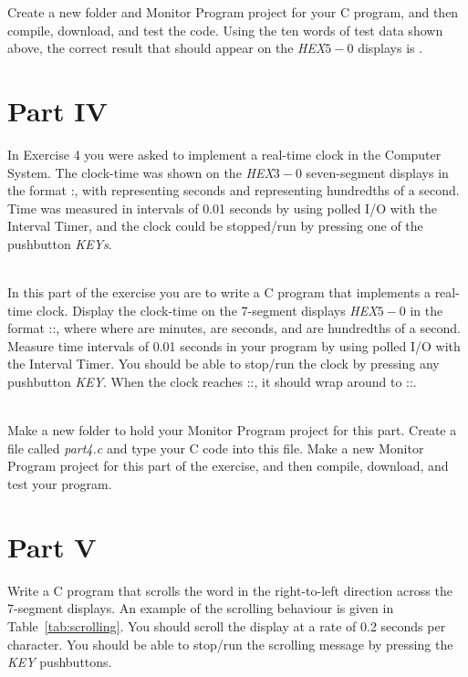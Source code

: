 \documentclass[epsfig,10pt,fullpage]{article}
\begin{document}
Create a new folder and Monitor Program project for your C program, and then compile,
download, and test the code. Using the ten words of test data shown above, the correct
result that should appear on the {\it HEX}$5-0$ displays is .

\section*{Part IV}
In Exercise 4 you were asked to implement a real-time clock in the Computer System. The
clock-time was shown on the {\it HEX}$3-0$ seven-segment displays in the format :,
with  representing seconds and  representing hundredths of a second.
Time was measured in intervals of 0.01 seconds by using polled I/O with the Interval Timer, 
and the clock could be stopped/run by pressing one of the pushbutton {\it KEYs}.

~\\
In this part of the exercise you are to write a C program that implements a real-time
clock. Display the clock-time on the 7-segment displays {\it HEX}$5-0$
in the format ::, where 
where  are minutes,  are seconds, and  are hundredths of 
a second.  Measure time intervals of 0.01 seconds in your program by using polled I/O with the 
Interval Timer.  You should be able to stop/run the clock by pressing any pushbutton {\it KEY}.
When the clock reaches ::, it should wrap around to
::.

~\\
Make a new folder to hold your Monitor Program project for this part. Create a
file called {\it part4.c} and type your C code into this file.  Make a new Monitor Program 
project for this part of the exercise, and then compile, download, and test your program. 


\section*{Part V}
Write a C program that scrolls the word 
in the right-to-left direction across the 7-segment displays.
An example of the scrolling behaviour is given in Table~\ref{tab:scrolling}.
You should scroll the display at a rate of 0.2 seconds per character. You should be able to stop/run the scrolling
message by pressing the {\it KEY} pushbuttons.
\end{document}
